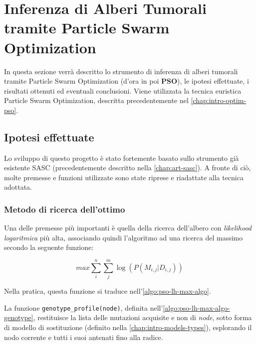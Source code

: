 \chapter{Inferenza di Alberi Tumorali tramite Particle Swarm Optimization}
\label{chap:pso}
In questa sezione verrà descritto lo strumento di inferenza di alberi tumorali tramite Particle Swarm Optimization (d'ora in poi \textbf{PSO}), le ipotesi effettuate, i risultati ottenuti ed eventuali conclusioni. Viene utilizzata la tecnica euristica Particle Swarm Optimization, descritta precedentemente nel \autoref{chap:intro-optim-pso}.

\section{Ipotesi effettuate}
\label{chap:pso-hip}
Lo sviluppo di questo progetto è stato fortemente basato sullo strumento già esistente SASC (precedentemente descritto nella \autoref{chap:art-sasc}). A fronte di ciò, molte premesse e funzioni utilizzate sono state riprese e riadattate alla tecnica adottata.

\subsection{Metodo di ricerca dell'ottimo}
\label{chap:pso-hip-optim}
Una delle premesse più importanti è quella della ricerca dell'albero con \textit{likelihood logaritmica} più alta, associando quindi l'algoritmo ad una ricerca del massimo secondo la seguente funzione:

\begin{equation}
  \label{eq:pso-lh-max}
  max \sum_i^n \sum_j^m \log ( P( M_{i,j} | D_{i,j} ) )
\end{equation}

Nella pratica, questa funzione si traduce nell'\autoref{algo:pso-lh-max-algo}.

La funzione \texttt{genotype\_profile(node)}, definita nell'\autoref{algo:pso-lh-max-algo-genotype}, restituisce la lista delle mutazioni acquisite e non di \textit{node}, sotto forma di modello di sostituzione (definito nella \autoref{chap:intro-models-types}), esplorando il nodo corrente e tutti i suoi antenati fino alla radice.

